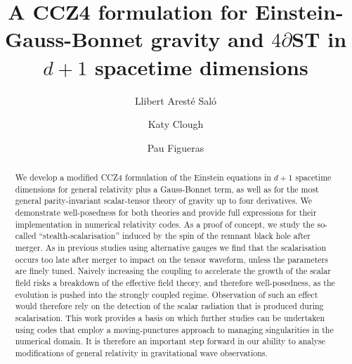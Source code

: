 \documentclass[reprint,aps,amsmath,amssymb,twoside,prd,showkeys,superscriptaddress,nofootinbib]{revtex4-2}
\begin{document}
\title{A CCZ4 formulation for Einstein-Gauss-Bonnet gravity and $4\partial$ST in $d+1$ spacetime dimensions}

\author{Llibert Arest\'e Sal\'o}

\author{Katy Clough}

\author{Pau Figueras}

\begin{abstract}
We develop a modified CCZ4 formulation of the Einstein equations in $d+1$ spacetime dimensions for general relativity plus a Gauss-Bonnet term, as well as for the most general parity-invariant scalar-tensor theory of gravity up to four derivatives. We demonstrate well-posedness for both theories and provide full expressions for their implementation in numerical relativity codes. As a proof of concept, we study the so-called ``stealth-scalarisation'' induced by the spin of the remnant black hole after merger. As in previous studies using alternative gauges we find that the scalarisation occurs too late after merger to impact on the tensor waveform, unless the parameters are finely tuned. Naively increasing the coupling to accelerate the growth of the scalar field risks a breakdown of the effective field theory, and therefore well-posedness, as the evolution is pushed into the strongly coupled regime. Observation of such an effect would therefore rely on the detection of the scalar radiation that is produced during scalarisation. This work provides a basis on which further studies can be undertaken using codes that employ a moving-punctures approach to managing singularities in the numerical domain. It is therefore an important step forward in our ability to analyse modifications of general relativity in gravitational wave observations.
\end{abstract}

\maketitle
\thispagestyle{fancy}
\end{document}
